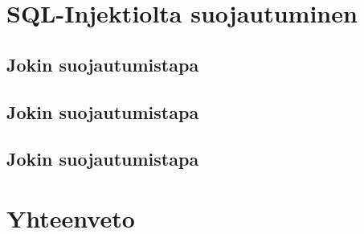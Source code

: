 \documentclass[finnish]{tktltiki2}
\theoremstyle{definition}
\theoremstyle{remark}
\begin{document}
\section {SQL-Injektiolta suojautuminen}
\subsection {Jokin suojautumistapa}
\subsection {Jokin suojautumistapa}
\subsection {Jokin suojautumistapa}
\section {Yhteenveto}




%
%
% 
%







% 
\end{document}
